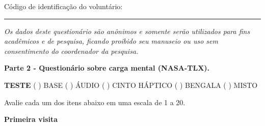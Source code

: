 {\color{gray}

Código de identificação do voluntário: \rule{1in}{.2mm}

\textit{Os dados deste questionário são anônimos e somente serão utilizados para fins acadêmicos e de pesquisa, ficando proibido seu manuseio ou uso sem consentimento do coordenador da pesquisa.}}

\begin{center}
\textbf{Parte 2 - Questionário sobre carga mental (NASA-TLX).}
\end{center}

\noindent
\textbf{TESTE} ( ) BASE \hfill ( ) ÁUDIO \hfill ( ) CINTO HÁPTICO \hfill ( ) BENGALA \hfill ( ) MISTO

Avalie cada um dos itens abaixo em uma escala de 1 a 20.

\hspace{1cm}

%
%
%
%
%
%
%
%
%
%
%
%
%
%
%
%
%
\textbf{Primeira visita}

